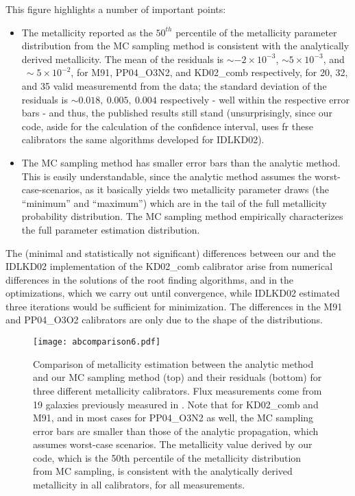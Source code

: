 \documentclass{emulateapj} \usepackage{amsmath} \usepackage{float}
\begin{document}
This figure highlights a number of important points:
\begin{itemize}

\item
The metallicity reported as the $50^{th}$ percentile of the
metallicity parameter distribution from the MC sampling method is
consistent with the analytically derived metallicity. The mean of the
residuals is $\sim-2\times10^{-3}$, $\sim5\times10^{-3}$, and
$~\sim5\times10^{-2}$, for M91, PP04\_O3N2, and KD02\_comb
respectively, for 20, 32, and 35 valid measurementd from the
\citet{modjaz11} data; the standard deviation of the residuals is
$\sim0.018,~ 0.005,~ 0.004$ respectively - well within the respective
error bars - and thus, the published results still stand
(unsurprisingly, since our code, aside for the calculation of the
confidence interval, uses fr these calibrators the same algorithms
developed for IDLKD02).
\item
The MC sampling method has smaller error bars than the analytic
method. This is easily understandable, since the analytic method
assumes the worst-case-scenarios, as it basically yields two
metallicity parameter draws (the ``minimum'' and ``maximum'') which
are in the tail of the full metallicity probability distribution. The
MC sampling method 
empirically
characterizes the full parameter estimation distribution.

\end{itemize}

The (minimal and statistically not significant) differences between
our and the IDLKD02 implementation of the KD02\_comb calibrator arise
from numerical differences in the solutions of the root finding
algorithms, and in the optimizations, which we carry out until
convergence, while IDLKD02 estimated three iterations would be
sufficient for minimization. The differences in the M91 and PP04\_O3O2
calibrators are only due to the shape of the distributions.

\begin{figure}[ht!]
  \texttt{[image: abcomparison6.pdf]}
   \caption{Comparison of metallicity estimation between the analytic
     method and our MC sampling method (top) and their residuals
     (bottom) for three different metallicity calibrators. Flux
     measurements come from 19 galaxies previously measured in
     \citet{modjaz11}.  Note that for KD02\_comb and M91, and in most
     cases for PP04\_O3N2 as well, the MC sampling error bars are
     smaller than those of the analytic propagation, which assumes
     worst-case scenarios. The metallicity value derived by our code,
     which is the 50th percentile of the metallicity distribution from
     MC sampling, is consistent with the analytically derived
     metallicity in all calibrators, for all measurements.}
 \label{comp_anal_MC}
\end{figure}
\end{document}
